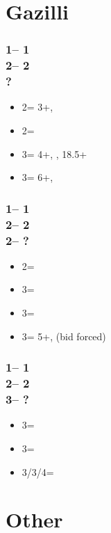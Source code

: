 \documentclass[12pt, a4paper]{article}
\begin{document}
\section{Gazilli}

\subsubsection*{1\hearts -- 1\spades\\
                2\clubs -- 2\hearts\\
                ?}
\begin{itemize}
    \item 2\spades = 3+\spades, \nf
    \item 2\nt = \gf
    \item 3\minor = 4+\minor, \nf, 18.5+
    \item 3\hearts = 6+\hearts, \inv
\end{itemize}

\subsubsection*{1\hearts -- 1\spades\\
                2\clubs -- 2\hearts\\
                2\spades -- ?}
\begin{itemize}
    \item 2\nt = \gf
    \item 3\minor = \gf
    \item 3\hearts = \nf
    \item 3\spades = 5+\spades, \nf (bid forced)
\end{itemize}

\subsubsection*{1\hearts -- 1\spades\\
                2\clubs -- 2\hearts\\
                3\minor -- ?}
\begin{itemize}
    \item 3\diams = \nt
    \item 3\nt = \gf
    \item 3\hearts/3\spades/4\minor = \nf
\end{itemize}

\section{Other}
\end{document}
